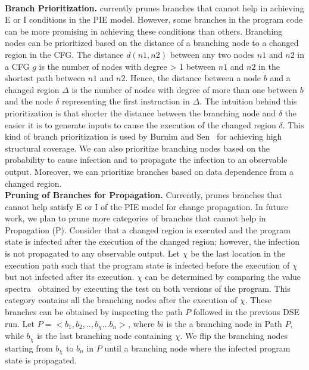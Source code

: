 \\ \textbf{Branch Prioritization.}  currently prunes branches that cannot help in achieving E or I conditions in the PIE model. However, some branches in the program code can be more promising in achieving these conditions than others. Branching nodes can be prioritized based on the distance of a branching node to a changed region in the CFG. The distance $d(n1, n2)$ between any two nodes $n1$ and $n2$  in a CFG $g$ is the number of nodes with degree > 1 between $n1$ and $n2$ in the shortest path between $n1$ and $n2$. Hence, the distance between a node $b$ and a changed region $\Delta$ is the number of nodes with degree of more than one between $b$ and the node $\delta$ representing the first instruction in $\Delta$. The intuition behind this prioritization is that shorter the distance between the branching node and $\delta$ the easier it is to generate inputs to cause the execution of the changed region $\delta$. This kind of branch prioritization is used by Burnim and Sen~\cite{burnim} for achieving high structural coverage. We can also prioritize branching nodes based on the probability to cause infection and to propagate the infection to an observable output. Moreover, we can prioritize branches based on data dependence from a changed region.
\\ \textbf{Pruning of Branches for Propagation.} Currently,  prunes branches that cannot help satisfy E or I of the PIE model for change propagation. In future work, we plan to prune more categories of branches that cannot help in Propagation (P). Consider that a changed region is executed and the program state is infected after the execution of the changed region; however, the infection is not propagated to any observable output. Let $\chi$ be the last location in the execution path such that the program state is infected before the execution of $\chi$ but not infected after its execution. $\chi$ can be determined by comparing the value spectra~\cite{xie05:checking} obtained by executing the test on both versions of the program. This category contains all the branching nodes after the execution of $\chi$. These branches can be obtained by inspecting the path $P$ followed in the previous DSE run. Let $P = <b_1, b_2,.., b_\chi...b_n>$, where $bi$ is the a  branching node in Path $P$, while $b_\chi$ is the last branching node containing $\chi$. We flip the branching nodes starting from $b_\chi$ to $b_n$ in $P$ until a branching node where the infected program state is propagated.


